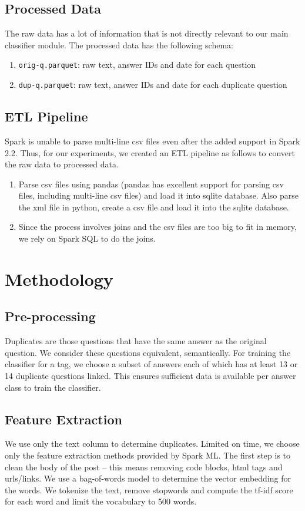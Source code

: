 \documentclass{article}
\begin{document}
\subsection{Processed Data}
The raw data has a lot of information that is not directly relevant to our main classifier module. The processed data has the following schema:
\begin{enumerate}
	\item \texttt{orig-q.parquet}: raw text, answer IDs and date for each question
	\item \texttt{dup-q.parquet}: raw text, answer IDs and date for each duplicate question
\end{enumerate}

\subsection{ETL Pipeline}
Spark\cite{spark} is unable to parse multi-line csv files even after the added support in Spark 2.2. Thus, for our experiments, we created an ETL pipeline as follows to convert the raw data to processed data.
\begin{enumerate}
	\item Parse csv files using pandas\cite{pandas} (pandas has excellent support for parsing csv files, including multi-line csv files) and load it into sqlite database. Also parse the xml file in python, create a csv file and load it into the sqlite\cite{sqlite} database.
	\item Since the process involves joins and the csv files are too big to fit in memory, we rely on Spark SQL to do the joins.
\end{enumerate}

\section{Methodology}
\subsection{Pre-processing}
Duplicates are those questions that have the same answer as the original question. We consider these questions equivalent, semantically. For training the classifier for a tag, we choose a subset of answers each of which has at least 13 or 14 duplicate questions linked. This ensures sufficient data is available per answer class to train the classifier.

\subsection{Feature Extraction}
We use only the text column to determine duplicates. Limited on time, we choose only the feature extraction methods provided by Spark ML. The first step is to clean the body of the post -- this means removing code blocks, html tags and urls/links. We use a bag-of-words model to determine the vector embedding for the words. We tokenize the text, remove stopwords and compute the tf-idf score for each word and limit the vocabulary to 500 words.
\end{document}
